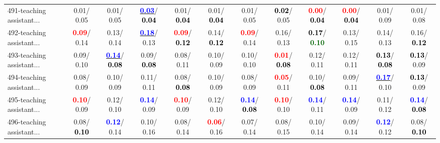 \begin{table}[h]
\begin{center}
{\begin{tabular}{lc|c|c|c|c|c|c|c|c|c|c}
491-teaching assistant... &   0.01/  0.05 &   0.01/  0.05 & \underline{\textcolor{blue}{\textbf{  0.03}}}/\textcolor{black}{\textbf{  0.04}} &   0.01/\textcolor{black}{\textbf{  0.04}} &   0.01/\textcolor{black}{\textbf{  0.04}} &   0.01/  0.05 & \textcolor{black}{\textbf{  0.02}}/  0.05 & \textcolor{red}{\textbf{  0.00}}/\textcolor{black}{\textbf{  0.04}} & \textcolor{red}{\textbf{  0.00}}/\textcolor{black}{\textbf{  0.04}} &   0.01/  0.09 &   0.01/  0.08 \\
492-teaching assistant... & \textcolor{red}{\textbf{  0.09}}/  0.14 &   0.13/  0.14 & \underline{\textcolor{blue}{\textbf{  0.18}}}/  0.13 & \textcolor{red}{\textbf{  0.09}}/\textcolor{black}{\textbf{  0.12}} &   0.14/\textcolor{black}{\textbf{  0.12}} & \textcolor{red}{\textbf{  0.09}}/  0.14 &   0.16/  0.13 & \textcolor{black}{\textbf{  0.17}}/\textcolor{darkgreen}{\textbf{  0.10}} &   0.13/  0.15 &   0.14/  0.13 &   0.16/\textcolor{black}{\textbf{  0.12}} \\
493-teaching assistant... &   0.09/  0.10 & \underline{\textcolor{blue}{\textbf{  0.14}}}/\textcolor{black}{\textbf{  0.08}} &   0.09/\textcolor{black}{\textbf{  0.08}} &   0.08/  0.11 &   0.10/  0.09 &   0.10/  0.10 & \textcolor{red}{\textbf{  0.01}}/\textcolor{black}{\textbf{  0.08}} &   0.12/  0.11 &   0.12/  0.11 & \textcolor{black}{\textbf{  0.13}}/\textcolor{black}{\textbf{  0.08}} & \textcolor{black}{\textbf{  0.13}}/  0.09 \\
494-teaching assistant... &   0.08/  0.09 &   0.10/  0.09 &   0.11/  0.11 &   0.08/\textcolor{black}{\textbf{  0.08}} &   0.10/  0.09 &   0.08/  0.09 & \textcolor{red}{\textbf{  0.05}}/  0.11 &   0.10/\textcolor{black}{\textbf{  0.08}} &   0.09/  0.11 & \underline{\textcolor{blue}{\textbf{  0.17}}}/  0.10 & \textcolor{black}{\textbf{  0.13}}/  0.09 \\ \hline
495-teaching assistant... & \textcolor{red}{\textbf{  0.10}}/  0.09 &   0.12/  0.10 & \textcolor{blue}{\textbf{  0.14}}/  0.09 & \textcolor{red}{\textbf{  0.10}}/  0.09 &   0.12/  0.10 & \textcolor{blue}{\textbf{  0.14}}/\textcolor{black}{\textbf{  0.08}} & \textcolor{red}{\textbf{  0.10}}/  0.10 & \textcolor{blue}{\textbf{  0.14}}/  0.11 & \textcolor{blue}{\textbf{  0.14}}/  0.09 &   0.11/  0.12 & \textcolor{blue}{\textbf{  0.14}}/\textcolor{black}{\textbf{  0.08}} \\
496-teaching assistant... &   0.08/\textcolor{black}{\textbf{  0.10}} & \textcolor{blue}{\textbf{  0.12}}/  0.14 &   0.10/  0.16 &   0.08/  0.14 & \textcolor{red}{\textbf{  0.06}}/  0.16 &   0.07/  0.14 &   0.08/  0.15 &   0.10/  0.14 &   0.09/  0.14 & \textcolor{blue}{\textbf{  0.12}}/  0.12 &   0.08/\textcolor{black}{\textbf{  0.10}} \\

\end{tabular}}
\end{center}
\end{table}

